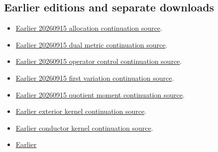 \documentclass[
]{article}
\providecommand{\tightlist}{%
  \setlength{\itemsep}{0pt}\setlength{\parskip}{0pt}}
\begin{document}
\subsection{Earlier editions and separate
downloads}\label{earlier-editions-and-separate-downloads}

\begin{itemize}
\tightlist
\item
  \href{https://github.com/KokunoYumeto/zeta-function-research-reader/tree/88cec321ccb455d1906d4abce7dc08bea6c7676d/workbenches/splitzero-tandem/continuations/20260915-allocation-continuation}{Earlier
  20260915 allocation continuation source}.
\item
  \href{https://github.com/KokunoYumeto/zeta-function-research-reader/tree/b4076eb15afd6b036a8de62d67b88eef03efeb50/workbenches/splitzero-tandem/continuations/20260915-dual-metric-continuation}{Earlier
  20260915 dual metric continuation source}.
\item
  \href{https://github.com/KokunoYumeto/zeta-function-research-reader/tree/36b2654e1d3324c6de24e324ec34bb3a98f67103/workbenches/splitzero-tandem/continuations/20260915-operator-control-continuation}{Earlier
  20260915 operator control continuation source}.
\item
  \href{https://github.com/KokunoYumeto/zeta-function-research-reader/tree/af5c17948c24f43494ea76d823322e8b3924b58d/workbenches/splitzero-tandem/continuations/20260915-first-variation-continuation}{Earlier
  20260915 first variation continuation source}.
\item
  \href{https://github.com/KokunoYumeto/zeta-function-research-reader/tree/bf39bac055b76ce755b91401b35570bb84d76d9a/workbenches/splitzero-tandem/continuations/20260915-quotient-moment-continuation}{Earlier
  20260915 quotient moment continuation source}.
\item
  \href{https://github.com/KokunoYumeto/zeta-function-research-reader/tree/dad07e28faa735104ddc0b137521620fc315e6fc/workbenches/splitzero-tandem/continuations/20260914-exterior-kernel-continuation}{Earlier
  exterior kernel continuation source}.
\item
  \href{https://github.com/KokunoYumeto/zeta-function-research-reader/tree/41adc412ceb119ad9086b1f106e377f3de2d401a/workbenches/splitzero-tandem/continuations/20260914-conductor-kernel-continuation}{Earlier
  conductor kernel continuation source}.
\item
  \href{https://github.com/KokunoYumeto/zeta-function-research-reader/tree/5817ef9027257375b6ff3de7048b3331077251e7/workbenches/splitzero-tandem/continuations/20260914-original-kernel-matrices}{Earlier
}
\end{itemize}
\end{document}
